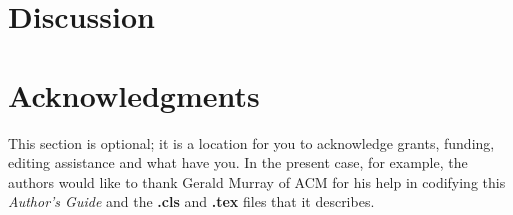 \documentclass{sig-alternate-05-2015}
\begin{document}
\section{Discussion}



\section{Acknowledgments}
This section is optional; it is a location for you
to acknowledge grants, funding, editing assistance and
what have you.  In the present case, for example, the
authors would like to thank Gerald Murray of ACM for
his help in codifying this \textit{Author's Guide}
and the \textbf{.cls} and \textbf{.tex} files that it describes.

%

%
%

\end{document}
